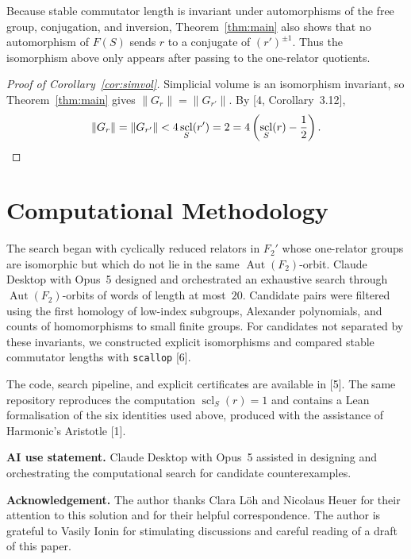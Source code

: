 \documentclass[12pt,a4paper,oneside]{amsart}
\DeclareMathOperator{\scl}{scl}
\theoremstyle{plain}
\theoremstyle{definition}
\begin{document}
Because stable commutator length is invariant under automorphisms of the free group, conjugation, and inversion, Theorem~\ref{thm:main} also shows that no automorphism of \(F(S)\) sends \(r\) to a conjugate of \((r')^{\pm1}\). Thus the isomorphism above only appears after passing to the one-relator quotients.

\begin{proof}[Proof of Corollary~\ref{cor:simvol}]\small
Simplicial volume is an isomorphism invariant, so Theorem~\ref{thm:main} gives \(\lVert G_r\rVert=\lVert G_{r'}\rVert\). By [4, Corollary~3.12],
\[
  \lVert G_r\rVert=\lVert G_{r'}\rVert
  <4\scl_S(r')=2
  =4\left(\scl_S(r)-\frac12\right).\qedhere
\]
\end{proof}

\section*{Computational Methodology}
The search began with cyclically reduced relators in \(F_2'\) whose one-relator groups are isomorphic but which do not lie in the same \(\operatorname{Aut}(F_2)\)-orbit. Claude Desktop with Opus~5 designed and orchestrated an exhaustive search through \(\operatorname{Aut}(F_2)\)-orbits of words of length at most~\(20\). Candidate pairs were filtered using the first homology of low-index subgroups, Alexander polynomials, and counts of homomorphisms to small finite groups. For candidates not separated by these invariants, we constructed explicit isomorphisms and compared stable commutator lengths with \texttt{scallop} [6].

The code, search pipeline, and explicit certificates are available in [5]. The same repository reproduces the computation \(\scl_S(r)=1\) and contains a Lean formalisation of the six identities used above, produced with the assistance of Harmonic's Aristotle [1].

\smallskip
\noindent\textbf{AI use statement.} Claude Desktop with Opus~5 assisted in designing and orchestrating the computational search for candidate counterexamples.

\smallskip
\noindent\textbf{Acknowledgement.} The author thanks Clara Löh and Nicolaus Heuer for their attention to this solution and for their helpful correspondence. The author is grateful to Vasily Ionin for stimulating discussions and careful reading of a draft of this paper.
\end{document}
